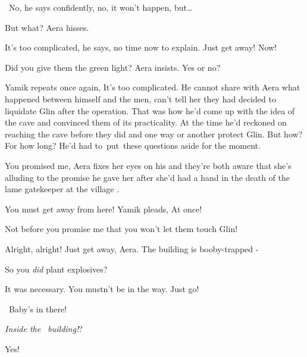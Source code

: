 \documentclass[letterpaper]{article}
\begin{document}
\ {\textquotedbl}No,{\textquotedbl} he says\textcolor[rgb]{0.0,0.4392157,0.7529412}{ }confidently,
{\textquotedbl}no,\textcolor[rgb]{0.0,0.4392157,0.7529412}{ }it won't happen, but{\dots}{\textquotedbl} 

{\textquotedbl}But what?{\textquotedbl} Aera hisses. 

{\textquotedbl}It's too complicated,{\textquotedbl} he says, {\textquotedbl}no time now to explain. Just get away!
Now!{\textquotedbl} 

{\textquotedbl}Did you give them the green light?{\textquotedbl} Aera insists. {\textquotedbl}Yes or no?{\textquotedbl} 

Yamik repeats once again, {\textquotedbl}It's too complicated.{\textquotedbl} He
cannot\textcolor[rgb]{0.0,0.4392157,0.7529412}{ }share with Aera what happened between himself and the men, can't tell
her they had decided to liquidate Glin after the operation. That was how he'd come up with the idea of the cave and
convinced them of its practicality. At the time he'd reckoned on reaching the cave before they did and one way or
another protect Glin. But how? For how long? He'd had to~put~these questions aside for the moment. 

{\textquotedbl}You promised me,{\textquotedbl} Aera fixes her eyes on his and they're both aware that she's alluding to
the promise he gave her after she'd had a hand in the death of the lame gatekeeper at the village .

{\textquotedbl}You must get away from here!{\textquotedbl} Yamik pleads, {\textquotedbl}At
once!{\textquotedbl}~~~~~~~~~~~ 

{\textquotedbl}Not before you promise me that you won't let them touch Glin!{\textquotedbl} 

{\textquotedbl}Alright, alright! Just get away, Aera\textcolor[rgb]{0.0,0.4392157,0.7529412}{. T}he building is
booby-trapped -{\textquotedbl} 

{\textquotedbl}So you \textit{did}\textcolor{red}{ }plant explosives?{\textquotedbl} 

{\textquotedbl}\textcolor[rgb]{0.0,0.4392157,0.7529412}{I}t was\textcolor[rgb]{0.0,0.4392157,0.7529412}{ }necessary. You
mustn't be in the way. Just go!{\textquotedbl}

~{\textquotedbl}Baby's in there!{\textquotedbl} 

{\textquotedbl}\textit{Inside the~ building!}?{\textquotedbl} 

{\textquotedbl}Yes!{\textquotedbl} 
\end{document}
